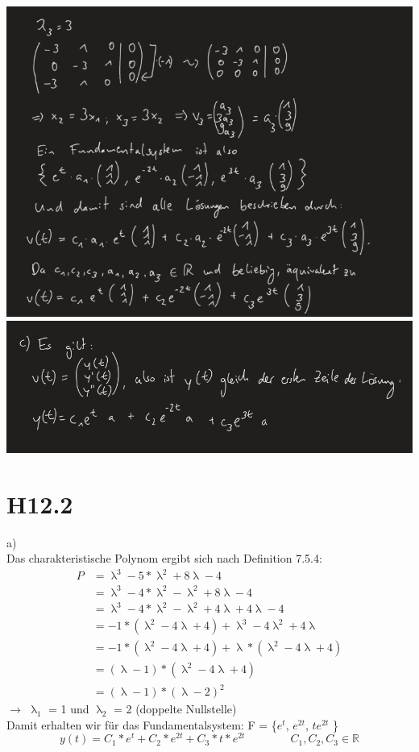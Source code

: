\documentclass{article}
\newcommand{\tab}{\qquad \qquad}
\begin{document}
\includegraphics[scale=0.5]{4} \\ 
\includegraphics[scale=0.5]{5}

\section*{H12.2}
\noindent a) \\
Das charakteristische Polynom ergibt sich nach Definition 7.5.4:
\begin{align*}
    P &= \uplambda^3 - 5 * \uplambda^2 + 8 \uplambda - 4 \\ 
      &= \uplambda^3 - 4 * \uplambda^2 - \uplambda^2 + 8 \uplambda - 4 \\ 
      &= \uplambda^3 - 4 * \uplambda^2 - \uplambda^2 + 4 \uplambda + 4 \uplambda - 4 \\ 
      &= -1 * (\uplambda^2 - 4 \uplambda + 4) + \uplambda^3 - 4 \uplambda^2 + 4 \uplambda \\
      &= -1 * (\uplambda^2 - 4 \uplambda + 4) + \uplambda * (\uplambda^2 - 4 \uplambda + 4) \\
      &= (\uplambda - 1) * (\uplambda^2 - 4 \uplambda + 4) \\   
      &= (\uplambda - 1) * (\uplambda - 2)^2  
\end{align*}
$\rightarrow$ $\uplambda_1$ = 1 und $\uplambda_2$ = 2 (doppelte Nullstelle) \\
Damit erhalten wir für das Fundamentalsystem: F = \{$e^t$, $e^{2t}$, $te^{2t}$ \}
\[
    y(t) = C_1 * e^t + C_2 * e^{2t}  + C_3 * t * e^{2t} \tab C_1, C_2, C_3 \in \mathds{R} 
\]
\end{document}
